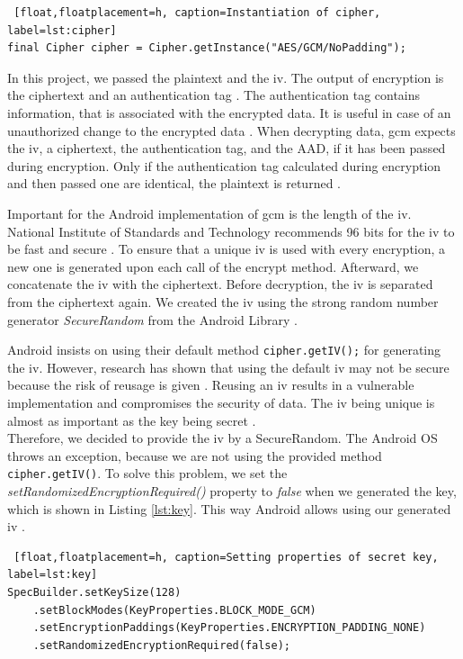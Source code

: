 \begin{lstlisting} [float,floatplacement=h, caption=Instantiation of cipher, label=lst:cipher]
final Cipher cipher = Cipher.getInstance("AES/GCM/NoPadding");
\end{lstlisting}

In this project, we passed the plaintext and the \gls{iv}. The output of encryption is the ciphertext and an authentication tag \cite{dworkin2007sp}. The authentication tag contains information, that is associated with the encrypted data. It is useful in case of an unauthorized change to the encrypted data \cite{AESJavaAndroid}. When decrypting data, \gls{gcm} expects the \gls{iv}, a ciphertext, the authentication tag, and the AAD, if it has been passed during encryption. Only if the authentication tag calculated during encryption and then passed one are identical, the plaintext is returned \cite{dworkin2007sp}.

Important for the Android implementation of \gls{gcm} is the length of the \gls{iv}. National Institute of Standards and Technology recommends 96 bits for the \gls{iv} to be fast and secure \cite{dworkin2007sp}. To ensure that a unique \gls{iv} is used with every encryption, a new one is generated upon each call of the encrypt method. Afterward, we concatenate the \gls{iv} with the ciphertext. Before decryption, the \gls{iv} is separated from the ciphertext again. We created the \gls{iv} using the strong random number generator \textit{SecureRandom} from the Android Library \cite{SecureRandom}.

Android insists on using their default method \texttt{cipher.getIV();} for generating the \gls{iv}. However, research has shown that using the default \gls{iv} may not be secure because the risk of reusage is given \cite{DefaultIV}. Reusing an \gls{iv} results in a vulnerable implementation and compromises the security of data. The \gls{iv} being unique is almost as important as the key being secret \cite{dworkin2007sp}. \\
Therefore, we decided to provide the \gls{iv} by a SecureRandom. The Android OS throws an exception, because we are not using the provided method \texttt{cipher.getIV()}. To solve this problem, we set the \textit{setRandomizedEncryptionRequired()} property to \textit{false} when we generated the key, which is shown in Listing \ref{lst:key}. This way Android allows using our generated \gls{iv} \cite{SecretsInAndroid}.

\begin{lstlisting} [float,floatplacement=h, caption=Setting properties of secret key, label=lst:key]
SpecBuilder.setKeySize(128)
    .setBlockModes(KeyProperties.BLOCK_MODE_GCM)
    .setEncryptionPaddings(KeyProperties.ENCRYPTION_PADDING_NONE)
    .setRandomizedEncryptionRequired(false);
\end{lstlisting}

